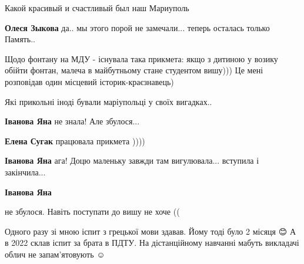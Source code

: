  
 
 
 
 
\qqSecCmt

\begin{itemize} %

Какой красивый и счастливый был наш Мариуполь

\begin{itemize} %
\textbf{Олеся Зыкова} да.. мы этого порой не замечали... теперь осталась только Память..
\end{itemize} %


Щодо фонтану на МДУ - існувала така прикмета: якщо з дитиною у возику обійти
фонтан, малеча в майбутньому стане студентом вишу))) Це мені розповідав один
місцевий історик-краєзнавець)

Які прикольні іноді бували маріупольці у своїх вигадках..

\begin{itemize} %
\textbf{Іванова Яна} не знала! Але збулося...

\textbf{Елена Сугак} працювала прикмета ))))

\textbf{Іванова Яна} ага! Доцю маленьку завжди там вигулювала... вступила і закінчила...

\textbf{Іванова Яна} 

не збулося. Навіть поступати до вишу не хоче ((

Одного разу зі мною іспит з грецької мови здавав. Йому тоді було 2 місяця 😊 А
в 2022 склав іспит за брата в ПДТУ. На дістанційному навчанні мабуть викладачі
облич не запам'ятовують ☺️

\end{itemize} %

\end{itemize} %
